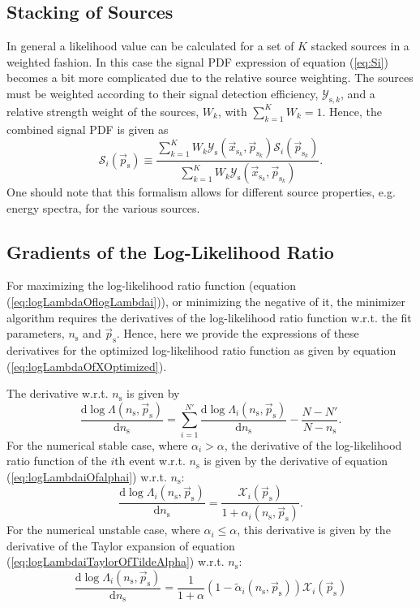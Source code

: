 \documentclass{article}
\newcommand{\ns}{n_{\mathrm{s}}}
\newcommand{\ps}{\vec{p}_{\mathrm{s}}}
\newcommand{\psk}{\vec{p}_{\mathrm{s}_k}}
\newcommand{\xsk}{\vec{x}_{\mathrm{s}_k}}
\begin{document}
\subsection{Stacking of Sources}

In general a likelihood value can be calculated for a set of $K$ stacked
sources in a weighted fashion. In this case the signal PDF expression of
equation (\ref{eq:Si}) becomes a bit more complicated due to the relative
source weighting. The sources must be weighted according to their signal detection
efficiency, $\mathcal{Y}_{\mathrm{s},k}$, and a relative strength weight of the
sources, $W_k$, with $\sum_{k=1}^{K} W_k = 1$. Hence, the combined signal PDF is
given as
\begin{equation}
 \mathcal{S}_i(\ps) \equiv \frac{\sum_{k=1}^{K} W_k \mathcal{Y}_{\mathrm{s}}(\xsk,\psk) \mathcal{S}_{i}(\psk)}{\sum_{k=1}^{K}W_k\mathcal{Y}_{\mathrm{s}}(\xsk,\psk)}.
 \label{eq:SiStacking}
\end{equation}
One should note that this formalism allows for different source properties, e.g.
energy spectra, for the various sources.


\subsection{Gradients of the Log-Likelihood Ratio}

For maximizing the log-likelihood ratio function (equation (\ref{eq:logLambdaOflogLambdai})),
or minimizing the negative of it, the minimizer algorithm requires the
derivatives of the log-likelihood ratio function w.r.t. the fit parameters,
$\ns$ and $\ps$.
Hence, here we provide the expressions of these derivatives
for the optimized log-likelihood ratio function as given by equation
(\ref{eq:logLambdaOfXOptimized}).

The derivative w.r.t. $\ns$ is given by
\begin{equation}
\frac{\mathrm{d} \log \Lambda(\ns,\ps)}{\mathrm{d} \ns} = \sum_{i=1}^{N'} \frac{\mathrm{d} \log \Lambda_i(\ns,\ps)}{\mathrm{d} \ns} - \frac{N - N'}{N - \ns}.
\end{equation}
For the numerical stable case, where $\alpha_i > \alpha$, the derivative of the
log-likelihood ratio function of the $i$th event w.r.t. $\ns$ is given by the
derivative of equation (\ref{eq:logLambdaiOfalphai}) w.r.t. $\ns$:
\begin{equation}
 \frac{\mathrm{d} \log \Lambda_i(\ns,\ps)}{\mathrm{d} \ns} = \frac{\mathcal{X}_i(\ps)}{1+\alpha_i(\ns,\ps)}.
 \label{eq:dlogLambdaidns-for-alphai-gt-alpha}
\end{equation}
For the numerical unstable case, where $\alpha_i \leq \alpha$, this derivative is
given by the derivative of the Taylor expansion of equation (\ref{eq:logLambdaiTaylorOfTildeAlpha})
w.r.t. $\ns$:
\begin{equation}
 \frac{\mathrm{d}\log\Lambda_i(\ns,\ps)}{\mathrm{d} \ns} = \frac{1}{1+\alpha}\left(1 - \tilde{\alpha}_i(\ns,\ps)\right) \mathcal{X}_i(\ps)
 \label{eq:dlogLambdaidns-for-alphai-le-alpha}
\end{equation}
\end{document}
